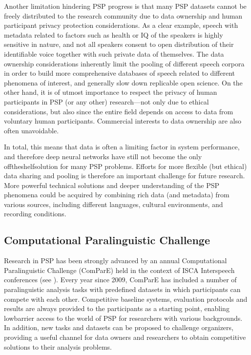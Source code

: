 \documentclass[letterpaper,10pt,english]{jupyterBook}
\begin{document}
\sphinxAtStartPar
Another limitation hindering PSP progress is that many PSP datasets
cannot be freely distributed to the research community due to data
ownership and human participant privacy protection considerations. As a
clear example, speech with metadata related to factors such as health or
IQ of the speakers is highly sensitive in nature, and not all speakers
consent to open distribution of their identifiable voice together with
such private data of themselves. The data ownership considerations
inherently limit the pooling of different speech corpora in order to
build more comprehensive databases of speech related to different
phenomena of interest, and generally slow down replicable open science.
On the other hand, it is of utmost importance to respect the privacy of
human participants in PSP (or any other) research—not only due to
ethical considerations, but also since the entire field depends on
access to data from voluntary human participants. Commercial interests
to data ownership are also often unavoidable.

\sphinxAtStartPar
In total, this means that data is often a limiting factor in system
performance, and therefore deep neural networks have still not become
the only off\sphinxhyphen{}the\sphinxhyphen{}shelf\sphinxhyphen{}solution for many PSP problems. Efforts for more
flexible (but ethical) data sharing and pooling is therefore an
important challenge for future research. More powerful technical
solutions and deeper understanding of the PSP phenomena could be
acquired by combining rich data (and metadata) from various sources,
including different languages, cultural environments, and recording
conditions.


\subsection{Computational Paralinguistic Challenge}
\label{\detokenize{Recognition/Paralinguistic_speech_processing:computational-paralinguistic-challenge}}
\sphinxAtStartPar
Research in PSP has been strongly advanced by an annual Computational
Paralinguistic Challenge (ComParE) held in the context of ISCA
Interspeech conferences (see ). Every
year since 2009, ComParE has included a number of paralinguistic
analysis tasks with pre\sphinxhyphen{}defined datasets in which participants can
compete with each other. Competitive baseline systems, evaluation
protocols and results are always provided to the participants as a
starting point, enabling low\sphinxhyphen{}barrier access to the world of PSP for
researchers with various backgrounds. In addition, new tasks and
datasets can be proposed to challenge organizers, providing a useful
channel for data owners and researchers to obtain competitive solutions
to their analysis problems.
\end{document}

